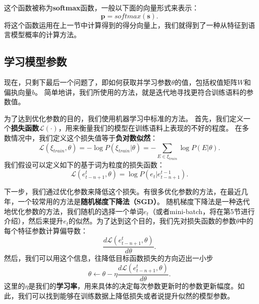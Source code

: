 \documentclass[10pt,a4paper]{ctexart}
\begin{document}
这个函数被称为\textbf{softmax}函数，一般以下面的向量形式来表示：
\[
 \textbf{p} = softmax(\textbf{s}).
\]
将这个函数运用在上一节中计算得到的得分向量上，我们就得到了一种从特征到语言模型概率的计算方法。

\subsection{学习模型参数}
现在，只剩下最后一个问题了，即如何获取并学习参数$\theta$的值，包括权值矩阵$W$和偏执向量$b$。
简单地讲，我们所使用的方法，就是迭代地寻找更符合训练语料的参数值。

为了达到优化参数的目的，我们使用机器学习中标准的方法。
首先，我们定义一个\textbf{损失函数}$\mathcal{L}(\cdot)$，用来衡量我们的模型在训练语料上表现的不好的程度。
在多数情况中，我们定义这个损失值等于\textbf{负对数似然}：
\[
 \mathcal{L}( \xi_{train},\theta ) = - \log P(\xi_{train} | \theta ) = - \sum_{E \in \xi_{train}} \log P(E |\theta).
\]
我们假设可以定义如下的基于词为粒度的损失函数：
\[
 \mathcal{L}(e_{t-n+1}^{t},\theta) = \log P(e_t | e_{t-n+1}^{t-1}).
\]

下一步，我们通过优化参数来降低这个损失。有很多优化参数的方法，在最近几年，一个较常用的方法是\textbf{随机梯度下降法（SGD）}。
随机梯度下降法是一种迭代地优化参数的方法，我们随机的选择一个单词$e_t$（或者mini-batch，将在第5节进行介绍），然后来提升$e_t$的似然。为了达到这个目的，我们先对损失函数的参数$\theta$中的每个特征参数计算偏导数：
\[
 \frac{d\mathcal{L}(e_{t-n+1}^{t},\theta)}{d\theta}.
\]
然后，我们可以用这个信息，往降低目标函数损失的方向迈出一小步
\[
 \theta \leftarrow \theta - \eta \frac{d\mathcal{L}(e_{t-n+1}^{t},\theta)}{d\theta}.
\]
这里的$\eta$是我们的\textbf{学习率}，用来具体的决定每次参数更新时的参数更新幅度。如此，我们可以找到能够在训练数据上降低损失或者说提升似然的模型参数。
\end{document}
